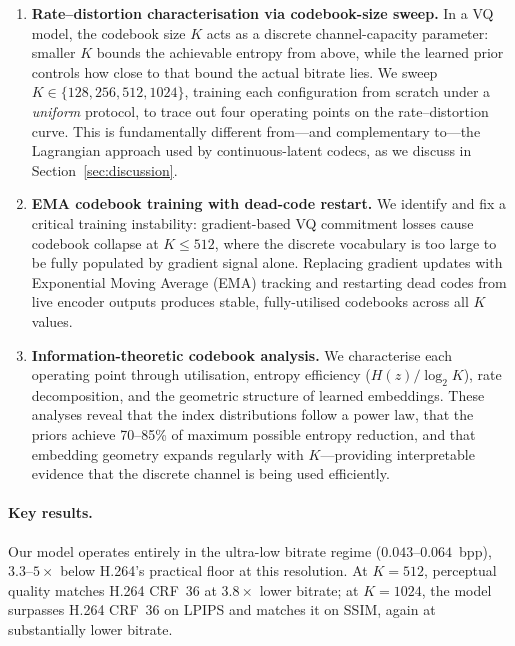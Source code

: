 \documentclass{article}
\begin{document}
\begin{enumerate}
\item \textbf{Rate--distortion characterisation via codebook-size sweep.}
  In a VQ model, the codebook size $K$ acts as a discrete channel-capacity
  parameter: smaller $K$ bounds the achievable entropy from above, while
  the learned prior controls how close to that bound the actual bitrate lies.
  We sweep $K \in \{128,256,512,1024\}$, training each configuration from
  scratch under a \emph{uniform} protocol, to trace out four operating points
  on the rate--distortion curve.
  This is fundamentally different from---and complementary to---the Lagrangian
  approach used by continuous-latent codecs, as we discuss in
  Section~\ref{sec:discussion}.

\item \textbf{EMA codebook training with dead-code restart.}
  We identify and fix a critical training instability: gradient-based VQ
  commitment losses cause codebook collapse at $K \leq 512$, where the
  discrete vocabulary is too large to be fully populated by gradient signal
  alone.
  Replacing gradient updates with Exponential Moving Average (EMA) tracking
  and restarting dead codes from live encoder outputs produces stable,
  fully-utilised codebooks across all $K$ values.

\item \textbf{Information-theoretic codebook analysis.}
  We characterise each operating point through utilisation, entropy
  efficiency ($H(z)/\log_2 K$), rate decomposition, and the geometric
  structure of learned embeddings.
  These analyses reveal that the index distributions follow a power law,
  that the priors achieve 70--85\% of maximum possible entropy reduction,
  and that embedding geometry expands regularly with $K$---providing
  interpretable evidence that the discrete channel is being used efficiently.
\end{enumerate}

\paragraph{Key results.}
Our model operates entirely in the ultra-low bitrate regime ($0.043$--$0.064$~bpp),
$3.3$--$5\times$ below H.264's practical floor at this resolution.
At $K{=}512$, perceptual quality matches H.264 CRF~36 at $3.8\times$ lower
bitrate; at $K{=}1024$, the model surpasses H.264 CRF~36 on LPIPS and matches
it on SSIM, again at substantially lower bitrate.
\end{document}
